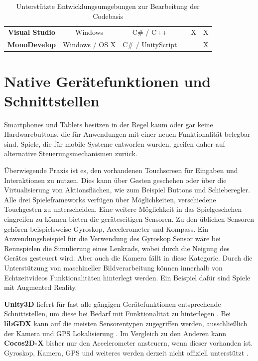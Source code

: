 \begin{table}[htbp]
{\begin{tabular}{cccccc}
			\rowcolor[HTML]{C0C0C0} 
			\textbf{Visual Studio}                         & Windows                                        & C\# / C++                                          &                                        & X                                         & X                                       \\
			\textbf{MonoDevelop}                           & Windows / OS X                                 & C\# / UnityScript                                  &                                        &                                           & X                                      
		\end{tabular}
	}
	\caption{Unterstützte Entwicklungsumgebungen zur Bearbeitung der Codebasis} \citep{libGDX_wiki, cocos2d_main_features, unity_code_editor}
	\label{ides}
\end{table}

\section{Native Gerätefunktionen und Schnittstellen}
Smartphones und Tablets besitzen in der Regel kaum oder gar keine Hardwarebuttons, die für Anwendungen mit einer neuen Funktionalität belegbar sind. Spiele, die für mobile Systeme entworfen wurden, greifen daher auf alternative Steuerungsmechanismen zurück.

\bigskip
Überwiegende Praxis ist es, den vorhandenen Touchscreen für Eingaben und Interaktionen zu nutzen. Dies kann über Gesten geschehen oder über die Virtualisierung von Aktionsflächen, wie zum Beispiel Buttons und Schieberegler. Alle drei Spieleframeworks verfügen über Möglichkeiten, verschiedene Touchgesten zu unterscheiden.
Eine weitere Möglichkeit in das Spielgeschehen eingreifen zu können bieten die geräteseitigen Sensoren. Zu den üblichen Sensoren gehören beispielsweise Gyroskop, Accelerometer und Kompass. Ein Anwendungsbeispiel für die Verwendung des Gyroskop Sensor wäre bei Rennspielen die Simulierung eines Lenkrads, wobei durch die Neigung des Gerätes gesteuert wird. Aber auch die Kamera fällt in diese Kategorie. Durch die Unterstützung von maschineller Bildverarbeitung können innerhalb von Echtzeitvideos Funktionalitäten hinterlegt werden. Ein Beispiel dafür sind Spiele mit Augmented Reality.

\bigskip
\textbf{Unity3D} liefert für fast alle gängigen Gerätefunktionen entsprechende Schnittstellen, um diese bei Bedarf mit Funktionalität zu hinterlegen \citep{unity_docs}. Bei \textbf{libGDX} kann auf die meisten Sensorentypen zugegriffen werden, ausschließlich der Kamera und GPS Lokalisierung \citep{libGDX_docs}. Im Vergleich zu den Anderen kann \textbf{Cocos2D-X} bisher nur den Accelerometer ansteuern, wenn dieser vorhanden ist. Gyroskop, Kamera, GPS und weiteres werden derzeit nicht offiziell unterstützt \citep{cocos2d_docs}. 

